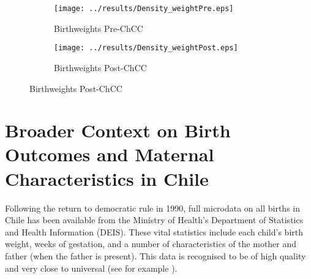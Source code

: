 \documentclass[12pt]{article}
\begin{document}
\begin{spacing}{1.4}
\begin{figure}[htpb!]
  \begin{center}
    \caption{Birthweight Distributions Pre- and Post-Program Implementation}
    \label{dists}
    \begin{subfigure}{.5\textwidth}
      \centering
      \texttt{[image: ../results/Density\_weightPre.eps]}
      \caption{Birthweights Pre-ChCC}
      \label{predists}
    \end{subfigure}%
    \begin{subfigure}{.5\textwidth}
      \centering
      \texttt{[image: ../results/Density\_weightPost.eps]}
      \caption{Birthweights Post-ChCC}
      \label{postdists}
    \end{subfigure} \vspace{-9mm}
  \end{center}
  \end{figure}


\clearpage


%

\clearpage
\setcounter{table}{0}
\renewcommand{\thetable}{D\arabic{table}}
\setcounter{figure}{0}
\renewcommand{\thefigure}{D\arabic{figure}}
\section{Broader Context on Birth Outcomes and Maternal Characteristics in Chile}
\label{app:context}
Following the return to democratic rule in 1990, full microdata on
all births in Chile has been available from the Ministry of Health's
Department of Statistics and Health Information (DEIS).  These
vital statistics include each child's birth weight, weeks of gestation,
and a number of characteristics of the mother and father (when the
father is present).  This data is recognised to be of high quality
and very close to universal (see for example \citet{Mikkelsenetal2015}).


\end{spacing}
\end{document}
